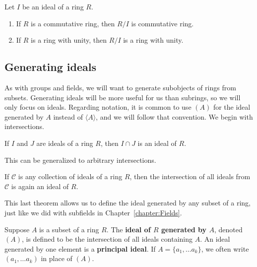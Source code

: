 \begin{theorem}\label{thm.CommutativityPassestoQuotients}
Let $I$ be an ideal of a ring $R$.
\begin{enumerate}
\item If $R$ is a commutative ring, then $R/I$ is commutative ring.
\item If $R$ is a ring with unity, then $R/I$ is a ring with unity.
\end{enumerate}
\end{theorem}

\subsection{Generating ideals}

As with groups and fields, we will want to generate subobjects of rings from subsets. Generating ideals will be more useful for us than subrings, so we will only focus on ideals. Regarding notation, it is common to use $(A)$ for the ideal generated by $A$ instead of $\langle A \rangle$, and we will follow that convention. We begin with intersections.

\begin{theorem}
If $I$ and $J$ are ideals of a ring $R$, then $I\cap J$ is an ideal of $R$.
\end{theorem}

This can be generalized to arbitrary intersections. 

\begin{theorem}
If $\mathcal{C}$ is any collection of ideals of a ring $R$, then the intersection of all ideals from $\mathcal{C}$ is again an ideal of $R$.
\end{theorem}

This last theorem allows us to define the ideal generated by any subset of a ring, just like we did with subfields in Chapter~\ref{chapter:Fields}.

\begin{definition}
Suppose $A$ is a subset of a ring $R$. The \textbf{ideal of $R$ generated by $A$}, denoted $(A)$, is defined to be the intersection of all ideals containing $A$.  An ideal generated by one element is a \textbf{principal ideal}. If $A = \{a_1,\ldots a_k\}$, we often write $(a_1,\ldots a_k)$ in place of $(A)$.
\end{definition}

